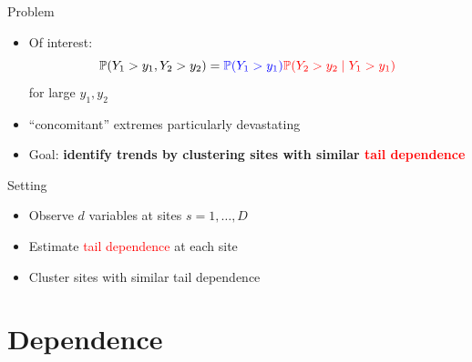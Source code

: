 \documentclass[14pt,aspectratio=169]{beamer}
\begin{document}
\begin{frame}{Problem} 
  \begin{itemize}
    \item <1-> Of interest:
      \[
        \mathbb{P}(Y_1 > y_1, Y_2 > y_2) = \textcolor{blue}{\mathbb{P}(Y_1 > y_1)}\textcolor{red}{\mathbb{P}(Y_2 > y_2 \mid Y_1 > y_1)}
      \]
      for large $y_1, y_2$
    \item <1-> ``concomitant'' extremes particularly devastating
    \item <2-> Goal: \textbf{identify trends by clustering sites with similar \textcolor{red}{tail dependence}}
  \end{itemize}
\end{frame}

\begin{frame}{Setting}
  \begin{itemize}
    \item Observe $d$ variables at sites $s=1, \ldots, D$
    \item Estimate \textcolor{red}{tail dependence} at each site
    \item Cluster sites with similar tail dependence
  \end{itemize}
\end{frame}

\section{Dependence}
\end{document}
